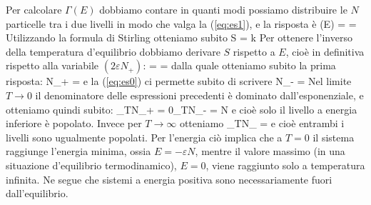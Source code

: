 Per calcolare $\Gamma(E)$ dobbiamo contare in quanti modi possiamo distribuire le $N$ particelle tra i due livelli in modo che valga la (\ref{eq:es1}), e la risposta è
\be
\Gamma(E) =  = 
\ee
Utilizzando la formula di Stirling otteniamo subito
\be
S = k\left[N\ln N - N_{+}\ln N_{+} - (N-N_{+})\ln(N-N_{+})\right]
\ee
Per ottenere l'inverso della temperatura d'equilibrio dobbiamo derivare $S$ rispetto a $E$, cioè in definitiva rispetto alla variabile $(2\varepsilon N_{+})$:
\be
{} =  = 
\ee
dalla quale otteniamo subito la prima risposta:
\be
\label{eq:es2}
N_{+} = 
\ee
e la (\ref{eq:es0}) ci permette subito di scrivere
\be
N_{-} = 
\ee
Nel limite $T\to 0$ il denominatore delle espressioni precedenti è dominato dall'esponenziale, e otteniamo quindi subito:
\be
\lim_{T}N_{+} = 0\qquad\qquad \lim_{T}N_{-} = N
\ee
e cioè solo il livello a energia inferiore è popolato. Invece per $T\to\infty$ otteniamo
\be
\lim_{T\to\infty}N_{\pm} = 
\ee
e cioè entrambi i livelli sono ugualmente popolati. Per l'energia ciò implica che a $T=0$ il sistema raggiunge l'energia minima, ossia $E = -\varepsilon N$, mentre il valore massimo (in una situazione d'equilibrio termodinamico), $E = 0$, viene raggiunto solo a temperatura infinita. Ne segue che sistemi a energia positiva sono necessariamente fuori dall'equilibrio.

